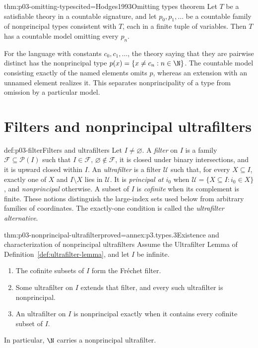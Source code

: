 \begin{hbtheorem}{thm:p03-omitting-types}{cited=Hodges1993}{Omitting types theorem}
Let \(T\) be a satisfiable theory in a countable signature, and let
\(p_0,p_1,\ldots\) be a countable family of nonprincipal types consistent
with \(T\), each in a finite tuple of variables.  Then \(T\) has a countable
model omitting every \(p_n\).
\end{hbtheorem}

For the language with constants \(c_0,c_1,\ldots\), the theory saying that
they are pairwise distinct has the nonprincipal type
\(p(x)=\{x\ne c_n:n\in\N\}\).  The countable model consisting exactly of the
named elements omits \(p\), whereas an extension with an unnamed element
realizes it.  This separates nonprincipality of a type from omission by a
particular model.

\section{Filters and nonprincipal ultrafilters}
\label{sec:p03-ultrafilters}

\begin{hbdefinition}{def:p03-filter}{Filters and ultrafilters}
Let \(I\ne\varnothing\).  A \emph{filter} on \(I\) is a family
\(\mathcal F\subseteq\mathcal P(I)\) such that \(I\in\mathcal F\),
\(\varnothing\notin\mathcal F\), it is closed under binary intersections,
and it is upward closed within \(I\).  An \emph{ultrafilter} is a filter
\(\mathcal U\) such that, for every \(X\subseteq I\), exactly one of \(X\)
and \(I\setminus X\) lies in \(\mathcal U\).  It is \emph{principal at
\(i_0\)} when \(\mathcal U=\{X\subseteq I:i_0\in X\}\), and
\emph{nonprincipal} otherwise.  A subset of \(I\) is \emph{cofinite} when
its complement is finite.  These notions distinguish the large-index sets
used below from arbitrary families of coordinates.
The exactly-one condition is called the \emph{ultrafilter alternative}.
\end{hbdefinition}

\begin{hblemma}{thm:p03-nonprincipal-ultrafilter}{proved=annex:p3.types.3}{Existence and characterization of nonprincipal ultrafilters}
Assume the Ultrafilter Lemma of Definition~\ref{def:ultrafilter-lemma}, and
let \(I\) be infinite.
\begin{enumerate}
  \item The cofinite subsets of \(I\) form the Fr\'echet filter.
  \item Some ultrafilter on \(I\) extends that filter, and every such
        ultrafilter is nonprincipal.
  \item An ultrafilter on \(I\) is nonprincipal exactly when it contains
        every cofinite subset of \(I\).
\end{enumerate}
In particular, \(\N\) carries a nonprincipal ultrafilter.
\end{hblemma}

